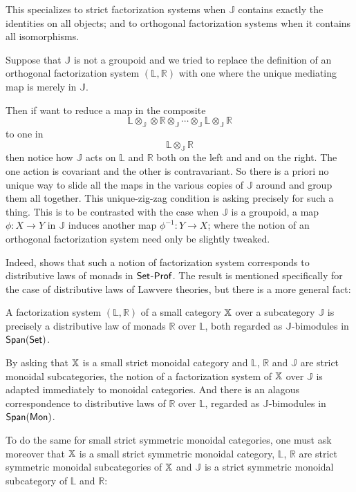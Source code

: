 This specializes to strict factorization systems when $\mathbb J$ contains exactly the identities on all objects; and to orthogonal factorization systems when it contains all isomorphisms. 


Suppose that  $\mathbb J $ is not a groupoid and we tried to replace the definition of an orthogonal factorization system $(\mathbb L, \mathbb R)$ with one where the unique mediating map is merely in $\mathbb J$.


Then if want to reduce a map in the composite
$$\mathbb{L} \otimes_{\mathbb J} \otimes \mathbb{R} \otimes_{\mathbb J}  \cdots \otimes_{\mathbb J} \mathbb{L} \otimes_{\mathbb J} \mathbb R  $$
 to one in 
$$\mathbb{L} \otimes_{\mathbb J} \mathbb{R}$$
then notice how $\mathbb J$ acts on $\mathbb L$ and $\mathbb R$ both on the left and and on the right.  The one action is covariant and the other is contravariant.  So there is a priori no unique way to slide all the maps in the various copies of $\mathbb J$ around and group them all together.  This unique-zig-zag condition is asking precisely for such a thing.  This is to be contrasted with the case when $\mathbb J$ is a groupoid, a map $\phi:X\to Y$ in $\mathbb J$ induces another map $\phi^{-1}:Y\to X$; where the notion of an orthogonal factorization system need only be slightly tweaked.


 Indeed, \cite{lawvere} shows that such a notion of factorization system corresponds to distributive laws of monads in $\mathsf{Set}$-${\sf Prof}$.   The result is mentioned specifically for the case of distributive laws of Lawvere theories, but there is a more general fact:


\begin{lemma}
A factorization system $(\mathbb{L},\mathbb{R})$ of a small  category $\mathbb{X}$ over a subcategory  $\mathbb J $ is precisely a distributive law of monads  $\mathbb{R}$ over $\mathbb{L}$, both regarded as $\mathbb{J}$-bimodules in $\mathsf{Span}(\mathsf{Set})$.
\end{lemma}


By asking that $\mathbb{X}$ is a small strict monoidal category and  $\mathbb{L}$, $\mathbb{R}$ and $\mathbb{J}$ are strict monoidal subcategories, the notion of a factorization system of $\mathbb{X}$ over $\mathbb J$ is adapted immediately to  monoidal categories. And there is an alagous correspondence  to distributive laws of $\mathbb{R}$ over $\mathbb{L}$, regarded as $\mathbb J$-bimodules in $\mathsf{Span}({\sf Mon})$.  


To do the same for small strict symmetric monoidal categories, one must ask moreover that $\mathbb{X}$ is a small strict symmetric monoidal category, $\mathbb{L}$, $\mathbb{R}$ are strict symmetric monoidal subcategories of $\mathbb{X}$ and $\mathbb J$ is a strict symmetric monoidal subcategory of $\mathbb L$ and $\mathbb R$:

